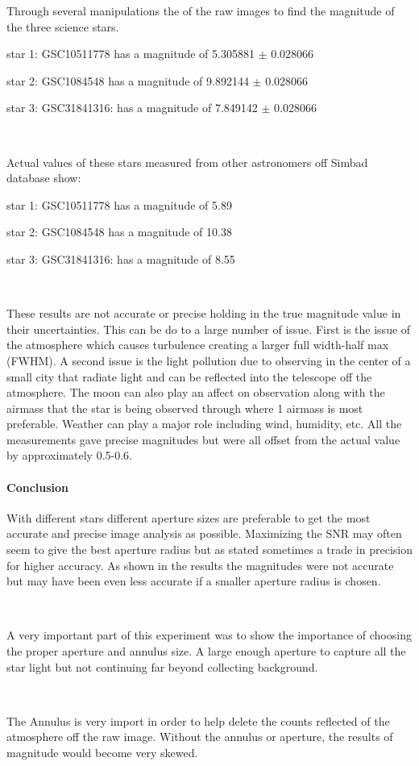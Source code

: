 \documentclass[12 pt,twoside]{article}
\begin{document}
Through several manipulations the of the raw images to find the magnitude of the three science stars. 

star 1: GSC10511778  has a magnitude of 5.305881 $\pm$ 0.028066

star 2: GSC1084548    has a magnitude of 9.892144 $\pm$ 0.028066

star 3: GSC31841316: has a magnitude of 7.849142 $\pm$ 0.028066

\ \

\noindent Actual values of these stars measured from other astronomers off Simbad database show:

star 1: GSC10511778  has a magnitude of 5.89

star 2: GSC1084548    has a magnitude of 10.38 

star 3: GSC31841316: has a magnitude of 8.55 

\ \ 

These results are not accurate or precise holding in the true magnitude value in their uncertainties. This can be do to a large number of issue. First is the issue of the atmosphere which causes turbulence creating a larger full width-half max (FWHM). A second issue is the light pollution due to observing in the center of a small city that radiate light and can be reflected into the telescope off the atmosphere. The moon can also play an affect on observation along with the airmass that the star is being observed through where 1 airmass is most preferable. Weather can play a major role including wind, humidity, etc. All the measurements gave precise magnitudes but were all offset from the actual value by approximately 0.5-0.6.

\paragraph{Conclusion}

With different stars different aperture sizes are preferable to get the most accurate and precise image analysis as possible. Maximizing the SNR may often seem to give the best aperture radius but as stated sometimes a trade in precision for higher accuracy. As shown in the results the magnitudes were not accurate but may have been even less accurate if a smaller aperture radius is chosen. 

\ \

A very important part of this experiment was to show the importance of choosing the proper aperture and annulus size. A large enough aperture to capture all the star light but not continuing far beyond collecting background.

\ \

The Annulus is very import in order to help delete the counts reflected of the atmosphere off the raw image. Without the annulus or aperture, the results of magnitude would become very skewed.
\end{document}
